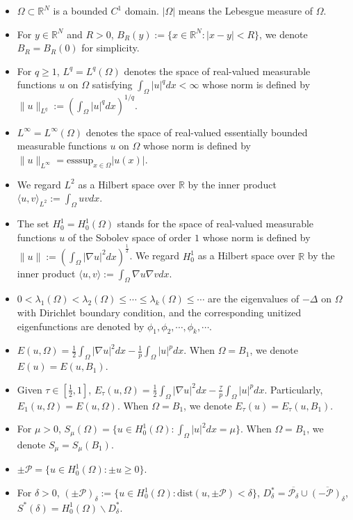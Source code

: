 \documentclass[10pt,a4paper]{article}
\theoremstyle{definition} \theoremstyle{remark}
\numberwithin{equation}{section}
\newcommand{\R}{\mathbb{R}}
\newcommand{\p}{\mathcal{P}}
\newcommand{\la}{\lambda}
\begin{document}
\begin{itemize}
	\item $\Omega \subset \R^N$ is a bounded $C^1$ domain. $|\Omega|$ means the Lebesgue measure of $\Omega$.
	\item For $y \in \R^N$ and $R > 0$, $B_R(y) := \{x \in \R^N: |x - y| < R\}$, we denote $B_R = B_R(0)$ for simplicity.
	\item For $q \ge 1$, $L^q = L^q(\Omega)$ denotes the space of real-valued measurable functions $u$ on $\Omega$ satisfying $\int_\Omega|u|^qdx < \infty$ whose norm is defined by $\|u\|_{L^q} := (\int_\Omega|u|^qdx)^{1/q}$.
	\item $L^\infty = L^\infty(\Omega)$ denotes the space of real-valued essentially bounded measurable functions
	$u$ on $\Omega$ whose norm is defined by $\|u\|_{L^\infty} = \text{esssup}_{x \in \Omega}|u(x)|$.
	\item We regard $L^2$ as a Hilbert space over $\R$ by the inner product $\langle u,v \rangle_{L^2} := \int_\Omega uv dx$.
	\item The set $H_0^1 = H_0^1(\Omega)$ stands for the space of real-valued measurable functions $u$ of the Sobolev space of order $1$ whose norm is defined by $\|u\| := (\int_\Omega |\nabla u|^2dx)^{\frac12}$. We regard $H_0^1$ as a Hilbert space over $\R$ by the inner product $\langle u,v \rangle := \int_\Omega \nabla u \nabla v dx$.
	\item $0 < \la_1(\Omega) < \la_2(\Omega) \leq \cdots \leq \la_k(\Omega) \le \cdots$ are the eigenvalues of $-\Delta$ on $\Omega$ with Dirichlet boundary condition, and the corresponding unitized eigenfunctions  are denoted by $\phi_1, \phi_2, \cdots, \phi_k, \cdots$.
 	\item $E(u,\Omega) = \frac12\int_\Omega |\nabla u|^2dx - \frac1p \int_\Omega |u|^pdx.$ When $\Omega = B_1$, we denote $E(u) = E(u,B_1)$.
 	\item Given $\tau \in [\frac12,1]$, $E_\tau(u,\Omega) = \frac12 \int_{\Omega}|\nabla u|^2dx - \frac{\tau}p\int_{\Omega} |u|^pdx$. Particularly, $E_1(u,\Omega) = E(u,\Omega)$. When $\Omega = B_1$, we denote $E_\tau(u) = E_\tau(u,B_1)$.
 	\item For $\mu > 0$, $S_\mu(\Omega) = \bigl\{u \in H_0^1(\Omega): \int_\Omega |u|^2dx = \mu\bigr\}$. When $\Omega = B_1$, we denote $S_\mu = S_\mu(B_1)$.
 	\item $\pm \p = \bigl\{u \in H_0^1(\Omega): \pm u \geq 0\bigr\}$.
 	\item For $\delta > 0$, $(\pm \p)_\delta := \bigl\{u \in H_0^1(\Omega): \text{dist}(u,\pm\p) < \delta\bigr\}$, $D^*_\delta = \overline{\p_\delta} \cup \overline{(-\p)_\delta}$, $S^*(\delta) = H_0^1(\Omega) \backslash D^*_\delta$.

\end{itemize}
\end{document}
